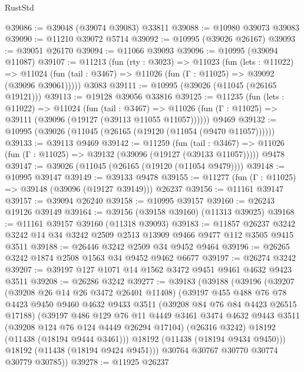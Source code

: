 \begin{lexlean}{RustStd}
\begin{coremodule}
@39086 := @39048 (@39074 @39083) @33811
@39088 := @10980 @39073 @39083
@39090 := @11210 @39072 @5714
@39092 := @10995 (@39026 @26167)
@39093 := @39051 @26170
@39094 := @11066 @39093
@39096 := @10995 (@39094 @11087)
@39107 := @11213
    (fun (rty : @3023) =>
    @11023
      (fun (lets : @11022) =>
      @11024 (fun (tail : @3467) => @11026 (fun (Γ : @11025) => @39092 (@39096 @39061)))))
    @3083
@39111 := @10995 (@39026 (@11045 (@26165 @19121)))
@39113 := @19128 @39056 @33816
@39125 := @11235
    (fun (lets : @11022) =>
    @11024
      (fun (tail : @3467) =>
      @11026 (fun (Γ : @11025) => @39111 (@39096 (@19127 (@39113 @11055 @11057))))))
    @9469
@39132 := @10995 (@39026 (@11045 (@26165 (@19120 (@11054 (@9470 @11057))))))
@39133 := @39113 @9469
@39142 := @11259
    (fun (tail : @3467) => @11026 (fun (Γ : @11025) => @39132 (@39096 (@19127 (@39133 @11057)))))
    @9478
@39147 := @39026 (@11045 (@26165 (@19120 (@11054 @9479))))
@39148 := @10995 @39147
@39149 := @39133 @9478
@39155 := @11277 (fun (Γ : @11025) => @39148 (@39096 (@19127 @39149))) @26237
@39156 := @11161 @39147
@39157 := @39094 @26240
@39158 := @10995 @39157
@39160 := @26243 @19126 @39149
@39164 := @39156 (@39158 @39160) (@11313 @39025)
@39168 := @11161 @39157 @39160 (@11318 @39093)
@39183 := @11857
    @26237
    @3242
    @3242
    @14
    @34
    @3242
    @2509
    @2513
    @13909
    @9466
    @9477
    @112
    @3505
    @9415
    @3511
@39188 := @26446 @3242 @2509 @34 @9452 @9464
@39196 := @26265 @3242 @1874 @2508 @1563 @34 @9452 @9462 @6677
@39197 := @26274 @3242
@39207 := @39197 @127 @1071 @14 @1562 @3472 @9451 @9461 @4632 @9423 @3511
@39208 := @26286 @3242
@39277 := @39183
    (@39188
      (@39196
        (@39207
          (@39208 @26 @14 @26 @3472 @26401 @11408)
          (@39197
            @455
            @488
            @76
            @78
            @4423
            @9450
            @9460
            @4632
            @9433
            @3511
            (@39208 @84 @76 @84 @4423 @26515 @17188)
            (@39197
              @486
              @129
              @76
              @11
              @4449
              @3461
              @3474
              @4632
              @9443
              @3511
              (@39208 @124 @76 @124 @4449 @26294 @17104)
              (@26316 @3242)
              @18192
              (@11438 (@18194 @9444 @3461)))
            @18192
            (@11438 (@18194 @9434 @9450)))
          @18192
          (@11438 (@18194 @9424 @9451)))
        @30764
        @30767
        @30770
        @30774
        @30779
        @30785))
@39278 := @11925 @26237

\end{coremodule}
\end{lexlean}
